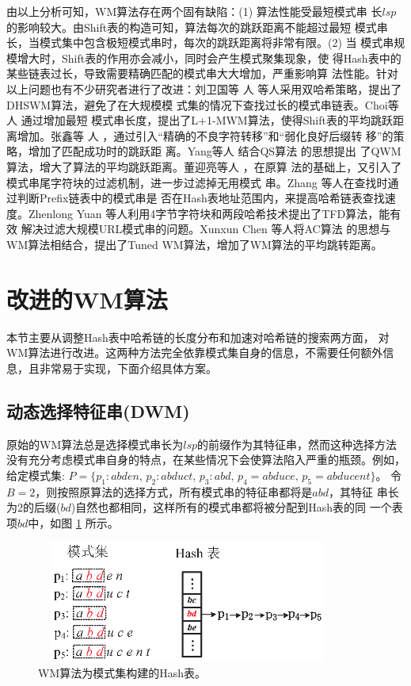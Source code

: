 由以上分析可知，WM算法存在两个固有缺陷：(1) 算法性能受最短模式串
长$lsp$的影响较大。由Shift表的构造可知，算法每次的跳跃距离不能超过最短
模式串长，当模式集中包含极短模式串时，每次的跳跃距离将非常有限。(2) 当
模式串规模增大时，Shift表的作用亦会减小，同时会产生模式聚集现象，使
得Hash表中的某些链表过长，导致需要精确匹配的模式串大大增加，严重影响算
法性能。针对以上问题也有不少研究者进行了改进：刘卫国等
人 \cite{Liu2011} 等人采用双哈希策略，提出了DHSWM算法，避免了在大规模模
式集的情况下查找过长的模式串链表。Choi等人\cite{Choi2011} 通过增加最短
模式串长度，提出了L+1-MWM算法，使得Shift表的平均跳跃距离增加。张鑫等
人 \cite{Zhang2003}，通过引入“精确的不良字符转移”和“弱化良好后缀转
移”的策略，增加了匹配成功时的跳跃距
离。Yang等人\cite{Hong2007} 结合QS算法 \cite{Sunday1990} 的思想提出
了QWM算法，增大了算法的平均跳跃距离。董迎亮等人 \cite{Dong2011}，在原算
法的基础上，又引入了模式串尾字符块的过滤机制，进一步过滤掉无用模式
串。Zhang \cite{Zhang2009b} 等人在查找时通过判断Prefix链表中的模式串是
否在Hash表地址范围内，来提高哈希链表查找速度。Zhenlong Yuan
\cite{Yuan2013} 等人利用4字节字符块和两段哈希技术提出了TFD算法，能有效
解决过滤大规模URL模式串的问题。Xunxun Chen \cite{Chen2005} 等人将AC算法
的思想与WM算法相结合，提出了Tuned WM算法，增加了WM算法的平均跳转距离。


\section{改进的WM算法}
\label{sec:5_DWM+}

本节主要从调整Hash表中哈希链的长度分布和加速对哈希链的搜索两方面，
对WM算法进行改进。这两种方法完全依靠模式集自身的信息，不需要任何额外信
息，且非常易于实现，下面介绍具体方案。

\subsection{动态选择特征串(DWM)}
\label{sec:5_DWM
}

原始的WM算法总是选择模式串长为$lsp$的前缀作为其特征串，然而这种选择方法
没有充分考虑模式串自身的特点，在某些情况下会使算法陷入严重的瓶颈。例如，
给定模式集:
$P=\{p_1:abden,\, p_2:abduct,\, p_3:abd,\, p_4=abduce,\,
p_5=abducent\}$。
令$B=2$，则按照原算法的选择方式，所有模式串的特征串都将是$abd$，其特征
串长为2的后缀($bd$)自然也都相同，这样所有的模式串都将被分配到Hash表的同
一个表项$bd$中，如图 \ref{fig:WM_hash_table1} 所示。


\begin{figure}[H]
  \centering
  \includegraphics[height=4cm ,width=10cm]{figures/5_WM/WM_hash_table1.eps}
  \caption{WM算法为模式集构建的Hash表。}
  \label{fig:WM_hash_table1}
\end{figure}

